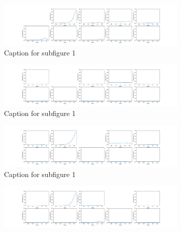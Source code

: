     \clearpage
    \begin{figure}[htb!]
        \centering
        \begin{subfigure}[b]{\textwidth}
            \centering
            \includegraphics[width=\textwidth]{chapters/results/CNN/Shade/acc1.png}
            \caption{Caption for subfigure 1}
            \label{fig:Shade-misclass0}
        \end{subfigure}
        \begin{subfigure}[b]{\textwidth}
            \centering
            \includegraphics[width=\textwidth]{chapters/results/CNN/Shade/acc2.png}
            \caption{Caption for subfigure 1}
            \label{fig:Shade-misclass0}
        \end{subfigure}
        \begin{subfigure}[b]{\textwidth}
            \centering
            \includegraphics[width=\textwidth]{chapters/results/CNN/Shade/acc3.png}
            \caption{Caption for subfigure 1}
            \label{fig:Shade-misclass0}
        \end{subfigure}
        \begin{subfigure}[b]{\textwidth}
            \centering
            \includegraphics[width=\textwidth]{chapters/results/CNN/Shade/acc4.png}

\end{subfigure}
\end{figure}
